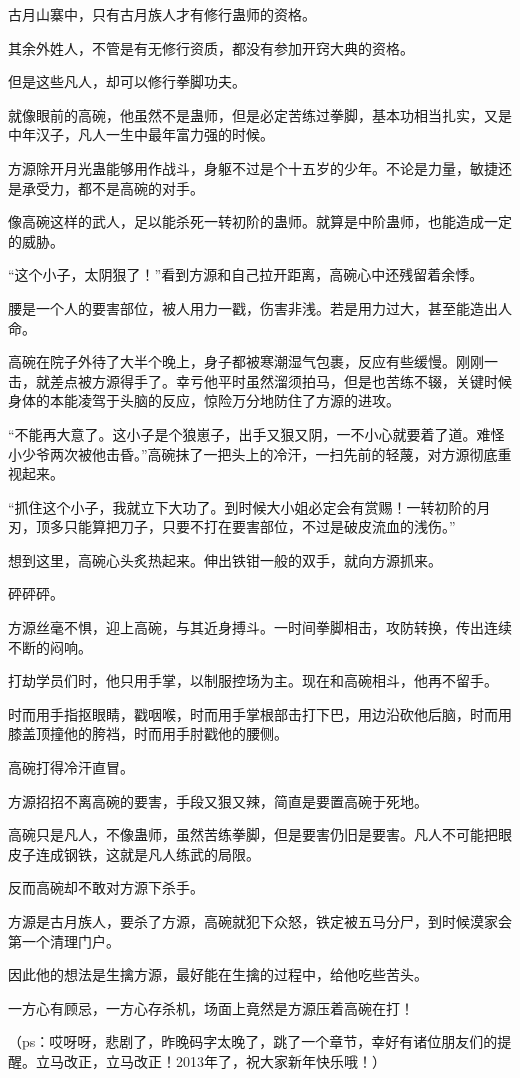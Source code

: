 \begin{this_body}
古月山寨中，只有古月族人才有修行蛊师的资格。

其余外姓人，不管是有无修行资质，都没有参加开窍大典的资格。

但是这些凡人，却可以修行拳脚功夫。

就像眼前的高碗，他虽然不是蛊师，但是必定苦练过拳脚，基本功相当扎实，又是中年汉子，凡人一生中最年富力强的时候。

方源除开月光蛊能够用作战斗，身躯不过是个十五岁的少年。不论是力量，敏捷还是承受力，都不是高碗的对手。

像高碗这样的武人，足以能杀死一转初阶的蛊师。就算是中阶蛊师，也能造成一定的威胁。

“这个小子，太阴狠了！”看到方源和自己拉开距离，高碗心中还残留着余悸。

腰是一个人的要害部位，被人用力一戳，伤害非浅。若是用力过大，甚至能造出人命。

高碗在院子外待了大半个晚上，身子都被寒潮湿气包裹，反应有些缓慢。刚刚一击，就差点被方源得手了。幸亏他平时虽然溜须拍马，但是也苦练不辍，关键时候身体的本能凌驾于头脑的反应，惊险万分地防住了方源的进攻。

“不能再大意了。这小子是个狼崽子，出手又狠又阴，一不小心就要着了道。难怪小少爷两次被他击昏。”高碗抹了一把头上的冷汗，一扫先前的轻蔑，对方源彻底重视起来。

“抓住这个小子，我就立下大功了。到时候大小姐必定会有赏赐！一转初阶的月刃，顶多只能算把刀子，只要不打在要害部位，不过是破皮流血的浅伤。”

想到这里，高碗心头炙热起来。伸出铁钳一般的双手，就向方源抓来。

砰砰砰。

方源丝毫不惧，迎上高碗，与其近身搏斗。一时间拳脚相击，攻防转换，传出连续不断的闷响。

打劫学员们时，他只用手掌，以制服控场为主。现在和高碗相斗，他再不留手。

时而用手指抠眼睛，戳咽喉，时而用手掌根部击打下巴，用边沿砍他后脑，时而用膝盖顶撞他的胯裆，时而用手肘戳他的腰侧。

高碗打得冷汗直冒。

方源招招不离高碗的要害，手段又狠又辣，简直是要置高碗于死地。

高碗只是凡人，不像蛊师，虽然苦练拳脚，但是要害仍旧是要害。凡人不可能把眼皮子连成钢铁，这就是凡人练武的局限。

反而高碗却不敢对方源下杀手。

方源是古月族人，要杀了方源，高碗就犯下众怒，铁定被五马分尸，到时候漠家会第一个清理门户。

因此他的想法是生擒方源，最好能在生擒的过程中，给他吃些苦头。

一方心有顾忌，一方心存杀机，场面上竟然是方源压着高碗在打！

（ps：哎呀呀，悲剧了，昨晚码字太晚了，跳了一个章节，幸好有诸位朋友们的提醒。立马改正，立马改正！2013年了，祝大家新年快乐哦！）

\end{this_body}

